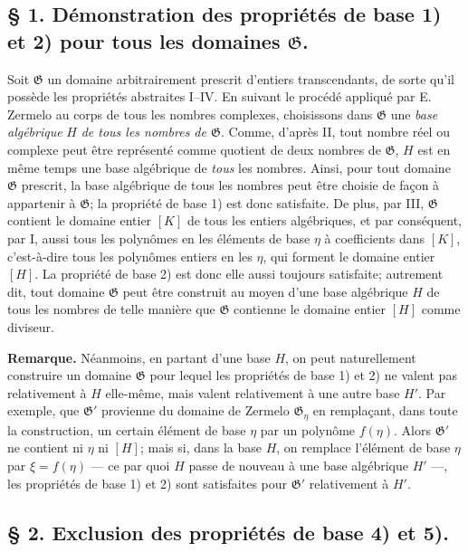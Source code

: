 \subsection*{\S{} 1. Démonstration des propriétés de base 1) et 2) pour tous les domaines $\mathfrak G$.}

Soit $\mathfrak G$ un domaine arbitrairement prescrit d'entiers transcendants, de sorte qu'il possède les propriétés abstraites I--IV. En suivant le procédé appliqué par E. Zermelo au corps de tous les nombres complexes, choisissons dans $\mathfrak G$ une \emph{base algébrique} $H$ \emph{de tous les nombres de $\mathfrak G$}. Comme, d'après II, tout nombre réel ou complexe peut être représenté comme quotient de deux nombres de $\mathfrak G$, $H$ est en même temps une base algébrique de \emph{tous} les nombres. Ainsi, pour tout domaine $\mathfrak G$ prescrit, la base algébrique de tous les nombres peut être choisie de façon à appartenir à $\mathfrak G$; la propriété de base 1) est donc satisfaite. De plus, par III, $\mathfrak G$ contient le domaine entier $[K]$ de tous les entiers algébriques, et par conséquent, par I, aussi tous les polynômes en les éléments de base $\eta$ à coefficients dans $[K]$, c'est-à-dire tous les polynômes entiers en les $\eta$, qui forment le domaine entier $[H]$. La propriété de base 2) est donc elle aussi toujours satisfaite; autrement dit, tout domaine $\mathfrak G$ peut être construit au moyen d'une base algébrique $H$ de tous les nombres de telle manière que $\mathfrak G$ contienne le domaine entier $[H]$ comme diviseur.

\textbf{Remarque.} Néanmoins, en partant d'une base $H$, on peut naturellement construire un domaine $\mathfrak G$ pour lequel les propriétés de base 1) et 2) ne valent pas relativement à $H$ elle-même, mais valent relativement à une autre base $H'$. Par exemple, que $\mathfrak G'$ provienne du domaine de Zermelo $\mathfrak G_\eta$ en remplaçant, dans toute la construction, un certain élément de base $\eta$ par un polynôme $f(\eta)$. Alors $\mathfrak G'$ ne contient ni $\eta$ ni $[H]$; mais si, dans la base $H$, on remplace l'élément de base $\eta$ par $\xi=f(\eta)$ --- ce par quoi $H$ passe de nouveau à une base algébrique $H'$ ---, les propriétés de base 1) et 2) sont satisfaites pour $\mathfrak G'$ relativement à $H'$.

\subsection*{\S{} 2. Exclusion des propriétés de base 4) et 5).}

